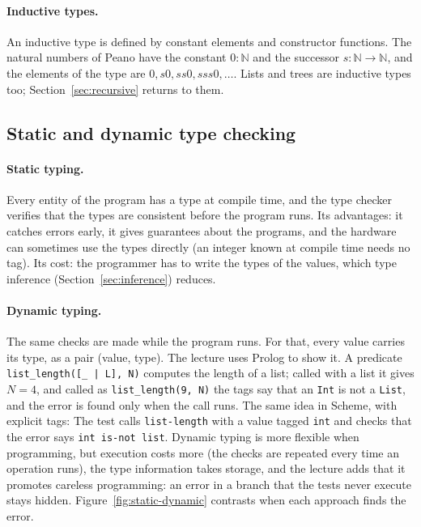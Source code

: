 \paragraph{Inductive types.} An inductive type is defined by constant elements
and constructor functions. The natural numbers of Peano have the constant
$0 : \mathbb{N}$ and the successor $s : \mathbb{N} \to \mathbb{N}$, and the
elements of the type are $0, s0, ss0, sss0, \dots$. Lists and trees are
inductive types too; Section~\ref{sec:recursive} returns to them.

\subsection{Static and dynamic type checking}

\paragraph{Static typing.} Every entity of the program has a type at compile
time, and the type checker verifies that the types are consistent before the
program runs. Its advantages: it catches errors early, it gives guarantees
about the programs, and the hardware can sometimes use the types directly
(an integer known at compile time needs no tag). Its cost: the programmer has
to write the types of the values, which type inference
(Section~\ref{sec:inference}) reduces.

\paragraph{Dynamic typing.} The same checks are made while the program runs.
For that, every value carries its type, as a pair (value, type). The lecture
uses Prolog to show it. A predicate
\texttt{list\_length([\_ | L], N)} computes the length of a list; called with a
list it gives $N = 4$, and called as \texttt{list\_length(9, N)} the tags say
that an \texttt{Int} is not a \texttt{List}, and the error is found only when
the call runs. The same idea in Scheme, with explicit tags:
The test calls \texttt{list-length} with a value tagged \texttt{int} and checks
that the error says \texttt{int is-not list}. Dynamic typing is more flexible
when programming, but execution costs more (the checks are repeated every
time an operation runs), the type information takes storage, and the lecture
adds that it promotes careless programming: an error in a branch that the
tests never execute stays hidden. Figure~\ref{fig:static-dynamic} contrasts
when each approach finds the error.

